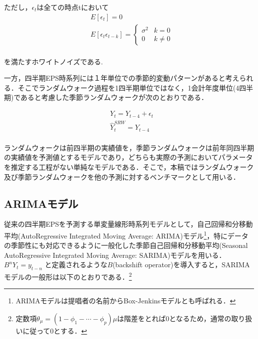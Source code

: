 \documentclass[a4paper，12pt]{jsarticle}
\begin{document}
ただし，$\epsilon_t$は全ての時点tにおいて
\begin{equation}
  \begin{split}
    & E[\epsilon_t] = 0 \\
    & E[\epsilon_t \epsilon_{t-k}] = \left\{
      \begin{array}{ll}
        \sigma^2 & k=0 \\
        0 & k \neq 0
      \end{array}\right.\\
  \end{split}
\end{equation}    

を満たすホワイトノイズである.

一方，四半期EPS時系列には１年単位での季節的変動パターンがあると考えられる．そこでランダムウォーク過程を1四半期単位ではなく，1会計年度単位(4四半期)であると考慮した季節ランダムウォークが次のとおりである．

\begin{equation}
  \begin{split}
    & Y_t = Y_{t-4} + \epsilon_t \\
    & \hat{Y}_t^{SRW} = Y_{t-4} \\
  \end{split}
\end{equation} 

ランダムウォークは前四半期の実績値を，季節ランダムウォークは前年同四半期の実績値を予測値とするモデルであり，どちらも実際の予測においてパラメータを推定する工程がない単純なモデルである．そこで，本稿ではランダムウォーク及び季節ランダムウォークを他の予測に対するベンチマークとして用いる．

\subsection{ARIMAモデル}

従来の四半期EPSを予測する単変量線形時系列モデルとして，自己回帰和分移動平均(AutoRegressive Integrated Moving Average: ARIMA)モデル\citep{box2015time}\footnote{ARIMAモデルは提唱者の名前からBox-Jenkinsモデルとも呼ばれる．}，特にデータの季節性にも対応できるように一般化した季節自己回帰和分移動平均(Seasonal AutoRegressive Integrated Moving Average: SARIMA)モデルを用いる．$B^nY_t = y_{t-n}$ と定義されるような$B$(backshift operator)を導入すると，SARIMAモデルの一般形は以下のとおりである．\footnote{定数項$\theta_{\mu}=(1-\phi_1-\cdots-\phi_p)\mu$は階差をとれば0となるため，通常の取り扱いに従って0とする．}
\end{document}
